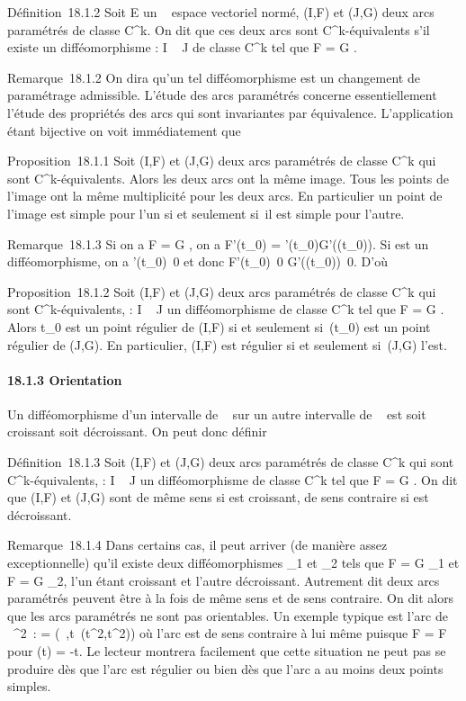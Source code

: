 \documentclass[]{article}
\begin{document}
Définition~18.1.2 Soit E un ~ espace vectoriel normé, (I,F) et (J,G)
deux arcs paramétrés de classe C^k. On dit que ces deux arcs
sont C^k-équivalents s'il existe un difféomorphisme \theta : I \rightarrow~ J
de classe C^k tel que F = G \cdot \theta.

Remarque~18.1.2 On dira qu'un tel difféomorphisme est un changement de
paramétrage admissible. L'étude des arcs paramétrés concerne
essentiellement l'étude des propriétés des arcs qui sont invariantes par
équivalence. L'application \theta étant bijective on voit immédiatement que

Proposition~18.1.1 Soit (I,F) et (J,G) deux arcs paramétrés de classe
C^k qui sont C^k-équivalents. Alors les deux arcs
ont la même image. Tous les points de l'image ont la même multiplicité
pour les deux arcs. En particulier un point de l'image est simple pour
l'un si et seulement si~il est simple pour l'autre.

Remarque~18.1.3 Si on a F = G \cdot \theta, on a F'(t_0) =
\theta'(t_0)G'(\theta(t_0)). Si \theta est un difféomorphisme, on a
\theta'(t_0)\neq~0 et donc
F'(t_0)\neq~0
\Leftrightarrow
G'(\theta(t_0))\neq~0. D'où

Proposition~18.1.2 Soit (I,F) et (J,G) deux arcs paramétrés de classe
C^k qui sont C^k-équivalents, \theta : I \rightarrow~ J un
difféomorphisme de classe C^k tel que F = G \cdot \theta. Alors
t_0 est un point régulier de (I,F) si et seulement
si~\theta(t_0) est un point régulier de (J,G). En particulier, (I,F)
est régulier si et seulement si~(J,G) l'est.

\paragraph{18.1.3 Orientation}

Un difféomorphisme d'un intervalle de ~ sur un autre intervalle de ~ est
soit croissant soit décroissant. On peut donc définir

Définition~18.1.3 Soit (I,F) et (J,G) deux arcs paramétrés de classe
C^k qui sont C^k-équivalents, \theta : I \rightarrow~ J un
difféomorphisme de classe C^k tel que F = G \cdot \theta. On dit que
(I,F) et (J,G) sont de même sens si \theta est croissant, de sens contraire
si \theta est décroissant.

Remarque~18.1.4 Dans certains cas, il peut arriver (de manière assez
exceptionnelle) qu'il existe deux difféomorphismes \theta_1 et
\theta_2 tels que F = G \cdot \theta_1 et F = G \cdot \theta_2, l'un
étant croissant et l'autre décroissant. Autrement dit deux arcs
paramétrés peuvent être à la fois de même sens et de sens contraire. On
dit alors que les arcs paramétrés ne sont pas orientables. Un exemple
typique est l'arc de ~^2~: \Gamma =
(~,t\mapsto~(t^2,t^2)) où
l'arc est de sens contraire à lui même puisque F \cdot \theta = F pour \theta(t) = -t.
Le lecteur montrera facilement que cette situation ne peut pas se
produire dès que l'arc est régulier ou bien dès que l'arc a au moins
deux points simples.
\end{document}

